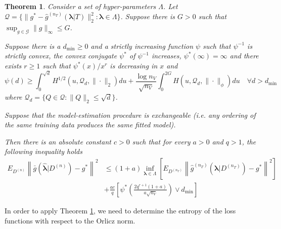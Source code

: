 \documentclass[12pt]{article}
\newtheorem{theorem}{Theorem}
\begin{document}
\begin{theorem}
	\label{thrm:mitchell}
	Consider a set of hyper-parameters $\Lambda$. Let
	$\mathcal{Q} = \{ \| g^* - \hat{g}^{(n_T)}(\boldsymbol{\lambda}|T) \|_2^2 : \boldsymbol{\lambda} \in \Lambda \}$.
	Suppose there is $G > 0$ such that $\sup_{g \in \mathcal{G}} \| g \|_\infty \le G$.
	
	Suppose there is a $d_{\min} \ge 0$ and a strictly increasing function $\psi$ such that $\psi^{-1}$ is strictly convex, the convex conjugate $\psi^*$ of $\psi^{-1}$ increases, $\psi^*(\infty ) = \infty$ and there exists $r \ge1$ such that $\psi^*(x)/x^r$ is decreasing in $x$ and
	\begin{equation}
	\label{eq:mitchell_dudley_bound}
	\psi(d) \ge \int_0^{\sqrt{d}} H^{1/2}(u, \mathcal{Q}_d, \| \cdot \|_2) du +
	\frac{\log n_V}{\sqrt{n_V}} \int_0^{2G} H(u, \mathcal{Q}_d, \| \cdot \|_\phi) du
	\quad
	\forall d > d_{\min}
	\end{equation}
	where $ \mathcal{Q}_d = \{ Q \in \mathcal{Q}: \| Q \|_2 \le \sqrt{d} \}$.
	
	Suppose that the model-estimation procedure is exchangeable (i.e. any ordering of the same training data produces the same fitted model).
	
	Then there is an absolute constant $c > 0$ such that for every $a > 0$ and $q > 1$, the following inequality holds
	\begin{align}
	E_{D^{(n)}} \left \| \bar{g} ( \hat{\boldsymbol \lambda} | {D^{(n)}} ) - g^* \right \|^2 
	&\le
	(1+a) \inf_{\boldsymbol{\lambda} \in \Lambda} \left [
	E_{D^{(n_T)}} \left \| \hat{g}^{(n_T)}(\boldsymbol \lambda | D^{(n_T)}) - g^* \right \|^2  
	\right ] \\
	& + \frac{ac}{q}\left [
	\psi^* \left (\frac{2q^{r + 1}(1+a)}{a\sqrt{n_V}} \right ) \vee d_{\min}
	\right ]
	\end{align}
\end{theorem}

In order to apply Theorem \ref{thrm:mitchell}, we need to determine the entropy of the loss functions with respect to the Orlicz norm.
\end{document}
